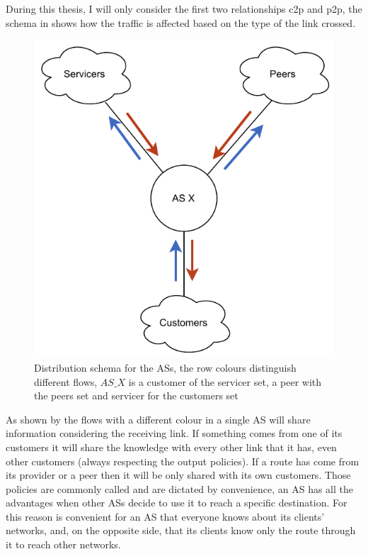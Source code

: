 During this thesis, I will only consider the first two relationships \ac{c2p} and
\ac{p2p}, the schema in  shows how the traffic is affected
based on the type of the link crossed.

\begin{figure}[ht]
    \centering
    \includegraphics[scale=0.75]{images/BGP/ASKnowledgeDistribution.pdf}
	\caption{Distribution schema for the \acp{AS}, the row colours distinguish
	different flows, $AS\_X$ is a customer of the servicer set, a peer with the
	peers set and servicer for the customers set}
    \label{fig:AS_flow}
\end{figure}


As shown by the flows with a different colour in  a single
\ac{AS} will share information considering the receiving link.
If something comes from one of its customers it will share the knowledge with
every other link that it has, even other customers (always respecting the output policies).
If a route has come from its provider or a peer then it will be only shared with
its own customers.
Those policies are commonly called  and are dictated by convenience,
an \ac{AS} has all the advantages when
other \acp{AS} decide to use it to reach a specific destination.
For this reason is convenient for an \ac{AS} that everyone knows about its clients'
networks, and, on the opposite side, that its clients know only the route
through it to reach other networks.

